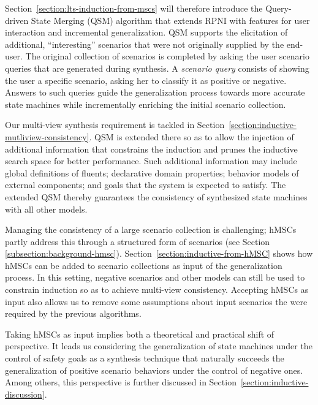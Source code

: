 Section~\ref{section:lts-induction-from-mscs} will therefore introduce the Query-driven State Merging (QSM) algorithm that extends RPNI with features for user interaction and incremental generalization. QSM supports the elicitation of additional, ``interesting'' scenarios that were not originally supplied by the end-user. The original collection of scenarios is completed by asking the user scenario queries that are generated during synthesis. A \emph{scenario query} consists of showing the user a specific scenario, asking her to classify it as positive or negative. Answers to such queries guide the generalization process towards more accurate state machines while incrementally enriching the initial scenario collection.

Our multi-view synthesis requirement is tackled in Section~\ref{section:inductive-mutliview-consistency}. QSM is extended there so as to allow the injection of additional information that constrains the induction and prunes the inductive search space for better performance. Such additional information may include global definitions of fluents; declarative domain properties; behavior models of external components; and goals that the system is expected to satisfy. The extended QSM thereby guarantees the consistency of synthesized state machines with all other models.

Managing the consistency of a large scenario collection is challenging; hMSCs partly address this through a structured form of scenarios (see Section \ref{subsection:background-hmsc}). Section~\ref{section:inductive-from-hMSC} shows how hMSCs can be added to scenario collections as input of the generalization process. In this setting, negative scenarios and other models can still be used to constrain induction so as to achieve multi-view consistency. Accepting hMSCs as input also allows us to remove some assumptions about input scenarios the were required by the previous algorithms.

Taking hMSCs as input implies both a theoretical and practical shift of perspective. It leads us considering the generalization of state machines under the control of safety goals as a synthesis technique that naturally succeeds the generalization of positive scenario behaviors under the control of negative ones. Among others, this perspective is further discussed in Section~\ref{section:inductive-discussion}.
